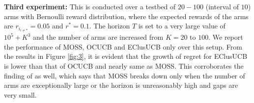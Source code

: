 \textbf{Third experiment:} This is conducted over a testbed of $20-100$ (interval of $10$) arms with Bernoulli reward distribution, where the expected rewards of the arms are $r_{i_{{i}\neq {*}}}=0.05$ and $r^{*}=0.1$. The horizon $T$ is set to a very large value of $10^{5} + K^{3}$ and the number of arms are increased from $K=20$ to $100$. We report the performance of MOSS, OCUCB and EClusUCB only over this setup. From the results in Figure \ref{fig:3}, it is evident that the growth of regret for EClusUCB is lower than that of OCUCB and nearly same as MOSS. This corroborates the finding of \citet{lattimore2015optimally} as well, which says that MOSS breaks down only when the number of arms are exceptionally large or the horizon is unreasonably high and gaps are very small.


